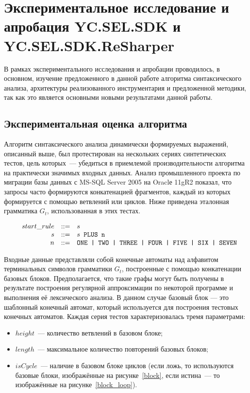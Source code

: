 \chapter{Экспериментальное исследование и апробация YC.SEL.SDK и YC.SEL.SDK.ReSharper} \label{chaptEval}

В рамках экспериментального исследования и апробации проводилось, в основном, изучение предложенного в данной работе алгоритма синтаксического анализа, архитектуры реализованного инструментария и предложенной методики, так как это является основными новыми результатами данной работы.


\section{Экспериментальная оценка алгоритма}

Алгоритм синтаксического анализа динамически формируемых выражений, описанный выше, был протестирован на нескольких сериях синтетических тестов, цель которых~--- убедиться в приемлемой производительности алгоритма на практически значимых входных данных. Анализ промышленного проекта по миграции базы данных с MS-SQL Server 2005 на Oraclе 11gR2 показал, что запросы часто формируются конкатенацией фрагментов, каждый из которых формируется с помощью ветвлений или циклов. Ниже приведена эталонная грамматика $G_t$, использованная в этих тестах.

$$
\begin{array}{crcl}
& start\_rule &::=& s \\
& s & ::= & s \mbox{\texttt{ PLUS }} \mbox{\texttt{n}}\\
& n & ::= & \mbox{\texttt{ONE | }} \mbox{\texttt{TWO | }} \mbox{\texttt{THREE | }} \mbox{\texttt{FOUR | }} \mbox{\texttt{FIVE | }} \mbox{\texttt{SIX | }} \mbox{\texttt{SEVEN}}
\end{array}
$$

Входные данные представляли собой конечные автоматы над алфавитом терминальных символов грамматики $G_t$, построенные с помощью конкатенации базовых блоков. Предполагается, что такие графы могут быть получены в результате построения регулярной аппроксимации по некоторой программе и выполнения её лексического анализа. В данном случае базовый блок --- это шаблонный конечный автомат, который используется для построения тестовых конечных автоматов. Каждая серия тестов характеризовалась тремя параметрами: 

\begin{itemize}
  \item $height$~--- количество ветвлений в базовом блоке;
  \item $length$~--- максимальное количество повторений базовых блоков;
  \item $isCycle$~--- наличие в базовом блоке циклов (если ложь, то используются базовые блоки, изображённые на рисунке~\ref{block}, если истина~--- то изображённые на рисунке~\ref{block_loop}).
\end{itemize}


